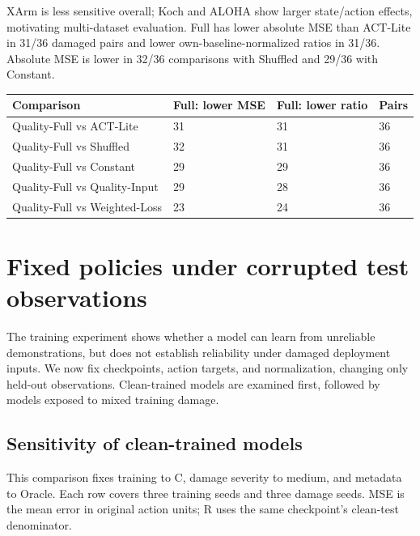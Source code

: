 \documentclass[11pt,a4paper]{article}
\begin{document}
XArm is less sensitive overall; Koch and ALOHA show larger state/action effects, motivating multi-dataset evaluation. Full has lower absolute MSE than ACT-Lite in 31/36 damaged pairs and lower own-baseline-normalized ratios in 31/36. Absolute MSE is lower in 32/36 comparisons with Shuffled and 29/36 with Constant.

\begin{table}[htbp]
\centering
\small
\begin{tabularx}{\linewidth}{Y C{29mm} C{29mm} C{24mm}}
\toprule
Comparison & Full: lower MSE & Full: lower ratio & Pairs\\
\midrule
Quality-Full vs ACT-Lite & 31 & 31 & 36\\
Quality-Full vs Shuffled & 32 & 31 & 36\\
Quality-Full vs Constant & 29 & 29 & 36\\
Quality-Full vs Quality-Input & 29 & 28 & 36\\
Quality-Full vs Weighted-Loss & 23 & 24 & 36\\
\bottomrule
\end{tabularx}
\end{table}
\clearpage\section{Fixed policies under corrupted test observations}
The training experiment shows whether a model can learn from unreliable demonstrations, but does not establish reliability under damaged deployment inputs. We now fix checkpoints, action targets, and normalization, changing only held-out observations. Clean-trained models are examined first, followed by models exposed to mixed training damage.

\subsection{Sensitivity of clean-trained models}
This comparison fixes training to C, damage severity to medium, and metadata to Oracle. Each row covers three training seeds and three damage seeds. MSE is the mean error in original action units; R uses the same checkpoint's clean-test denominator.
\end{document}
